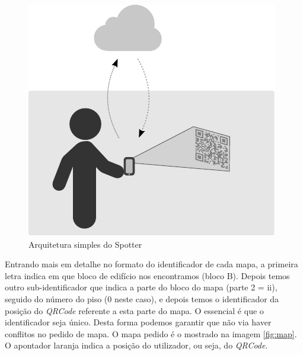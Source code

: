 \documentclass[twocolumn,twoside,11pt]{article}
\newcommand{\qrcode}{\emph{QRCode}}
\begin{document}
  \begin{figure}[width=\textwidth]
    \begin{center}
      \includegraphics{arch.pdf}
    \end{center}
    \caption{Arquitetura simples do Spotter}
    \label{fig:arch}
  \end{figure}

  Entrando mais em detalhe no formato do identificador de cada mapa, a primeira letra indica em que bloco de edifício nos encontramos (bloco B).
  Depois temos outro sub-identificador que indica a parte do bloco do mapa (parte 2 = ii), seguido do número do piso (0 neste caso), e depois temos o identificador da posição do \qrcode{} referente a esta parte do mapa.
  O essencial é que o identificador seja único.
  Desta forma podemos garantir que não via haver conflitos no pedido de mapa.
  O mapa pedido é o mostrado na imagem \ref{fig:map}.
  O apontador laranja indica a posição do utilizador, ou seja, do \qrcode.
\end{document}
